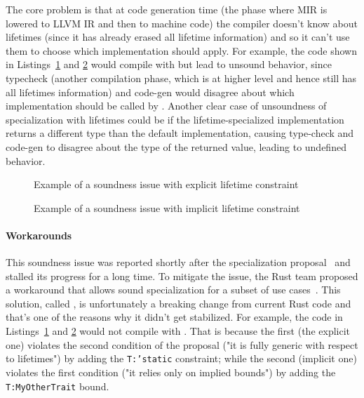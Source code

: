 The core problem is that at code generation time (the phase where MIR is lowered to LLVM IR and then to machine code) the compiler doesn't know about lifetimes (since it has already erased all lifetime information) and so it can't use them to choose which implementation should apply.
For example, the code shown in Listings~\ref{fig:soundness-lifetimes-explicit} and \ref{fig:soundness-lifetimes-implicit} would compile with  but lead to unsound behavior, since typecheck (another compilation phase, which is at higher level and hence still has all lifetimes information) and code-gen would disagree about which implementation should be called by .
Another clear case of unsoundness of specialization with lifetimes could be if the lifetime-specialized implementation returns a different type than the default implementation, causing type-check and code-gen to disagree about the type of the returned value, leading to undefined behavior.
\begin{figure}[htbp!]
	\centering
	\captionsetup{type=listing,skip=2pt}
	\caption{Example of a soundness issue with explicit lifetime constraint}
	\label{fig:soundness-lifetimes-explicit}
\end{figure}

\begin{figure}[htbp!]
	\centering
	\captionsetup{type=listing,skip=2pt}
	\caption{Example of a soundness issue with implicit lifetime constraint}
	\label{fig:soundness-lifetimes-implicit}
\end{figure}

\paragraph{Workarounds}
This soundness issue was reported shortly after the specialization proposal~\cite{SpecializationSoundness} and stalled its progress for a long time.
To mitigate the issue, the Rust team proposed a workaround that allows sound specialization for a subset of use cases~\cite{MinSpecialization}.
This solution, called , is unfortunately a breaking change from current Rust code and that's one of the reasons why it didn't get stabilized.
For example, the code in Listings~\ref{fig:soundness-lifetimes-explicit} and \ref{fig:soundness-lifetimes-implicit} would not compile with .
That is because the first (the explicit one) violates the second condition of the proposal ("it is fully generic with respect to lifetimes") by adding the \texttt{T:\@ 'static} constraint; while the second (implicit one) violates the first condition ("it relies only on implied bounds") by adding the \texttt{T:\@ MyOtherTrait} bound.

